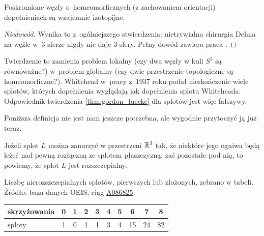 \begin{theorem}
    \label{thm:gordon_luecke}
    Poskromione węzły o~homeomorficznych (z zachowaniem orientacji) dopełnieniach są wzajemnie izotopijne.
\end{theorem}

\begin{proof}[Niedowód]
    Wynika to z~ogólniejszego stwierdzenia:
    nietrywialna chirurgia Dehna na węźle w~3-sferze nigdy nie daje 3-sfery.
    Pełny dowód zawiera praca \cite{gordon89}.
\end{proof}

Twierdzenie to zamienia problem lokalny (czy dwa węzły w kuli $S^3$ są równoważne?) w~problem globalny (czy dwie przestrzenie topologiczne są homeomorficzne?).
Whitehead w~pracy \cite{whitehead37} z~1937 roku podał nieskończenie wiele splotów, których dopełnienia wyglądają jak dopełnienia splotu Whiteheada.
Odpowiednik twierdzenia \ref{thm:gordon_luecke} dla splotów jest więc fałszywy.

Poniższa definicja nie jest nam jeszcze potrzebna, ale wygodnie przytoczyć ją już teraz.

\begin{definition}[rozszczepialność]
    Jeżeli splot $L$ można zanurzyć w przestrzeni $\mathbb R^3$ tak, że niektóre jego ogniwa będą leżeć nad pewną rozłączną ze splotem płaszczyzną, zaś pozostałe pod nią, to powiemy, że splot $L$ jest rozszczepialny.
\end{definition}

Liczbę nierozszczepialnych splotów, pierwszych lub złożonych, zebrano w tabeli.
Źródło: baza danych OEIS, ciąg \href{https://oeis.org/A086825}{A086825}.

\renewcommand*{\arraystretch}{1.4}
\footnotesize
\begin{longtable}{lccccccccc}
    \hline
    \textbf{skrzyżowania}  &  0  &  1  &  2  &  3  &  4  &  5  &  6   &  7   &  8   \\  \hline  \endhead
    sploty                 &  1  &  0  &  1  &  1  &  3  &  4  &  15  &  24  &  82  \\
    \hline
\end{longtable}
\normalsize

